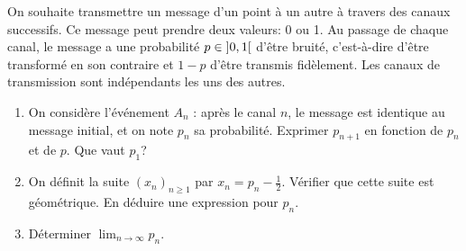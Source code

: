\begin{td-exo}[] %
    On souhaite transmettre un message d'un point à un autre
    à travers des canaux successifs. Ce message peut prendre
    deux valeurs: 0 ou 1. Au passage de chaque canal, le 
    message a une probabilité \(p\in\mathopen{}\left]0,1\right[\mathclose{}\) d'être bruité,
    c'est-à-dire d'être transformé en son contraire et \(1-p\)
    d'être transmis fidèlement. Les canaux de transmission
    sont indépendants les uns des autres.
    \begin{enumerate}
        \item On considère l'événement \(A_n\) : \og{}
        après le canal \(n\), le message est identique au
        message initial\fg{}, et on note \(p_n\) sa probabilité.
        Exprimer \(p_{n+1}\) en fonction de \(p_n\) et de \(p\).
        Que vaut \(p_1\)?

        \item On définit la suite \((x_n)_{n\geq 1}\) par 
        \(x_n = p_n-\frac12\). Vérifier que cette suite
        est géométrique. En déduire une expression pour
        \(p_n\).

        \item Déterminer \(\lim_{n\to\infty} p_n\).
    \end{enumerate}
\end{td-exo}
